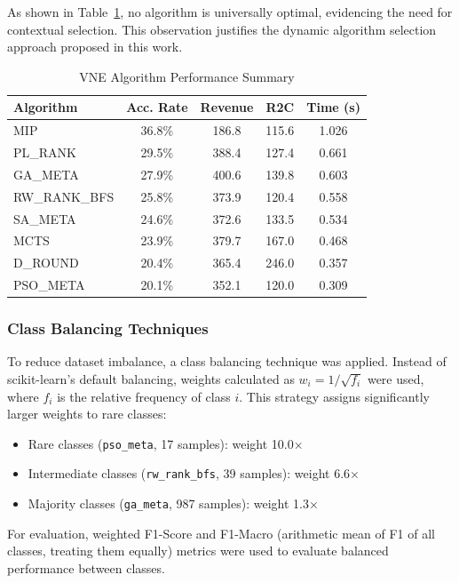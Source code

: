 \documentclass[a4paper,twoside]{article}
\begin{document}
As shown in Table~\ref{tab:algorithm-summary}, no algorithm is universally optimal, evidencing the need for contextual selection. This observation justifies the dynamic algorithm selection approach proposed in this work.

\begin{table}[H]
\centering
\tiny
\caption{VNE Algorithm Performance Summary}
\label{tab:algorithm-summary}
\begin{tabular}{lcccc}
\toprule
\textbf{Algorithm} & \textbf{Acc. Rate} & \textbf{Revenue} & \textbf{R2C} & \textbf{Time (s)} \\
\midrule
MIP & 36.8\% & 186.8 & 115.6 & 1.026 \\
PL\_RANK & 29.5\% & 388.4 & 127.4 & 0.661 \\
GA\_META & 27.9\% & 400.6 & 139.8 & 0.603 \\
RW\_RANK\_BFS & 25.8\% & 373.9 & 120.4 & 0.558 \\
SA\_META & 24.6\% & 372.6 & 133.5 & 0.534 \\
MCTS & 23.9\% & 379.7 & 167.0 & 0.468 \\
D\_ROUND & 20.4\% & 365.4 & 246.0 & 0.357 \\
PSO\_META & 20.1\% & 352.1 & 120.0 & 0.309 \\
\bottomrule
\end{tabular}
\end{table}



\subsubsection{Class Balancing Techniques}

To reduce dataset imbalance, a class balancing technique was applied.
%
Instead of scikit-learn's default balancing, weights calculated as $w_i = 1/\sqrt{f_i}$ were used, where $f_i$ is the relative frequency of class $i$. This strategy assigns significantly larger weights to rare classes:

\begin{itemize}
    \item Rare classes (\texttt{pso\_meta}, 17 samples): weight 10.0$\times$
    \item Intermediate classes (\texttt{rw\_rank\_bfs}, 39 samples): weight 6.6$\times$
    \item Majority classes (\texttt{ga\_meta}, 987 samples): weight 1.3$\times$
\end{itemize}

For evaluation, weighted F1-Score and F1-Macro (arithmetic mean of F1 of all classes, treating them equally) metrics were used to evaluate balanced performance between classes.
\end{document}
